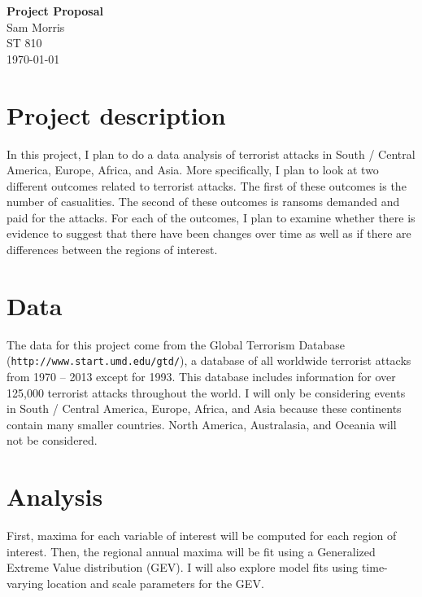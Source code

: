 \documentclass[11pt]{article}
\begin{document}
\begin{center}
{\Large {\bf Project Proposal} \\ Sam Morris \\ ST 810 }\\
\today
\end{center}


\section*{Project description}\label{s:intro}
In this project, I plan to do a data analysis of terrorist attacks in South / Central America, Europe, Africa, and Asia.
More specifically, I plan to look at two different outcomes related to terrorist attacks.
The first of these outcomes is the number of casualities.
The second of these outcomes is ransoms demanded and paid for the attacks.
For each of the outcomes, I plan to examine whether there is evidence to suggest that there have been changes over time as well as if there are differences between the regions of interest.

\section*{Data}
The data for this project come from the Global Terrorism Database ({\tt http://www.start.umd.edu/gtd/}), a database of all worldwide terrorist attacks from 1970 -- 2013 except for 1993.
This database includes information for over 125,000 terrorist attacks throughout the world.
I will only be considering events in South / Central America, Europe, Africa, and Asia because these continents contain many smaller countries.
North America, Australasia, and Oceania will not be considered.

\section*{Analysis}
First, maxima for each variable of interest will be computed for each region of interest.
Then, the regional annual maxima will be fit using a Generalized Extreme Value distribution (GEV).
I will also explore model fits using time-varying location and scale parameters for the GEV.

% 
% 
\end{document}
